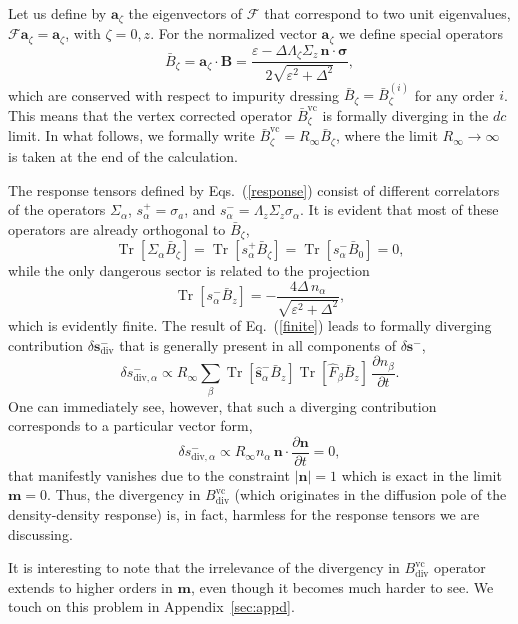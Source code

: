 \documentclass[%
  twocolumn,
  aps,
  prb,
  amsmath,
  amssymb,
  superscriptaddress,
  nofootinbib,
  floatfix
]{revtex4-1}
\newcommand{\s}{\sum\limits}
\newcommand{\pa}{\partial}
\newcommand{\be}{\begin{equation}}
\newcommand{\e}{\end{equation}}
\newcommand{\lt}{\left}
\newcommand{\rt}{\right}
\newcommand{\bb}{\boldsymbol}
\newcommand{\0}{^{\phantom{\dagger}}}
\DeclareMathOperator{\tr}{Tr}
\begin{document}
Let us define by $\bb{a}_\zeta$ the eigenvectors of $\mathcal{F}$ that correspond to two unit eigenvalues, $\mathcal{F}\bb{a}_\zeta=\bb{a}_\zeta$, with $\zeta=0, z$. For the  normalized vector $\bb{a}_\zeta$ we define special operators
\be
\label{Bdiv}
\bar{B}_\zeta=\bb{a}_\zeta \cdot \bb{B} 
= \frac{\varepsilon-\Delta \Lambda_\zeta \Sigma_z\,\bm{n}\cdot\bm{\sigma}}{2\sqrt{\varepsilon^2+\Delta^2}},
\e
which are conserved with respect to impurity dressing $\bar{B}_\zeta=\bar{B}_\zeta^{(i)}$ for any order $i$. This means that the vertex corrected operator $\bar{B}_\zeta^\textrm{vc}$ is formally diverging in the $dc$ limit. In what follows, we formally write $\bar{B}_\zeta^{\text{vc}} = R_\infty \bar{B}_\zeta$, where the limit $R_\infty \to \infty$ is taken at the end of the calculation.

The response tensors defined by Eqs.~(\ref{response}) consist of different correlators of the operators $\Sigma_\alpha$, $s^+_\alpha=\sigma_a$, and $s^-_\alpha = \Lambda_z\Sigma_z\sigma_\alpha$. It is evident that most of these operators are already orthogonal to $\bar{B}_\zeta$,
\be
\tr \lt[\Sigma_\alpha \bar{B}_\zeta\rt] = \tr \lt[s^+_\alpha \bar{B}_\zeta\rt]= \tr \lt[s^-_\alpha \bar{B}_0\rt] =0,
\e
while the only dangerous sector is related to the projection
\be
\label{finite}
\tr \lt[s^-_\alpha \bar{B}_z\rt] = - \frac{4\Delta\, n_\alpha}{\sqrt{\varepsilon^2+\Delta^2}},
\e
which is evidently finite. The result of Eq.~(\ref{finite}) leads to formally diverging contribution $\delta \bb{s}^-_\textrm{div}$ that is generally present in all components of $\delta \bb{s}^-$, 
\be
\delta s^{-}_{\textrm{div},\alpha}\propto  R_\infty
\s_\beta \tr[\hat{\bb{s}}_\alpha^- \bar{B}_z] \tr[\hat{F}_\beta \bar{B}_z] \,\frac{\pa n_\beta}{\pa t}.
\e
One can immediately see, however, that such a diverging contribution corresponds to a particular vector form,
\be
\label{divergence}
\delta s^{-}_{\textrm{div},\alpha} \propto R_\infty n_\alpha\, \bb{n}\cdot\frac{\pa \bb{n}}{\pa t} =0,
\e
that manifestly vanishes due to the constraint $|\bb{n}|=1$ which is exact in the limit $\bb{m}=0$. Thus, the divergency in $B_\textrm{div}^\textrm{vc}$ (which originates in the diffusion pole of the density-density response) is, in fact, harmless for the response 
tensors we are discussing. 

It is interesting to note that the irrelevance of the divergency in $B_\textrm{div}^\textrm{vc}$ operator extends to higher orders in $\bb{m}$, even though it becomes much harder to see. We touch on this problem in Appendix~\ref{sec:appd}. 
\end{document}
